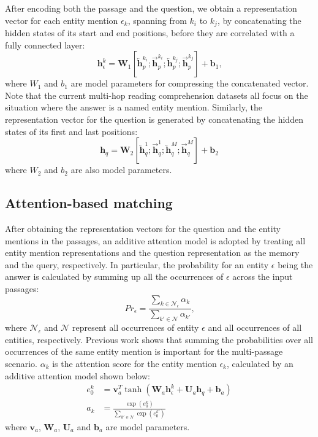 \documentclass[letterpaper]{article}
\begin{document}
After encoding both the passage and the question, we obtain a representation vector for each entity mention $\epsilon_k$, spanning from $k_i$ to $k_j$, by concatenating the hidden states of its start and end positions, before they are correlated with a fully connected layer:
\begin{equation} \label{eq:base_rep}
\boldsymbol{h}_\epsilon^k = \boldsymbol{W}_1 [\overleftarrow{\boldsymbol{h}}_p^{k_i};\overrightarrow{\boldsymbol{h}}_p^{k_i};\overleftarrow{\boldsymbol{h}}_p^{k_j};\overrightarrow{\boldsymbol{h}}_p^{k_j}]+\boldsymbol{b}_1 \textrm{,}
\end{equation}
where $W_1$ and $b_1$ are model parameters for compressing the concatenated vector.
Note that the current multi-hop reading comprehension datasets all focus on the situation where the answer is a named entity mention.
Similarly, the representation vector for the question is generated by concatenating the hidden states of its first and last positions:
\begin{equation}
\boldsymbol{h}_q = \boldsymbol{W}_2 [\overleftarrow{\boldsymbol{h}}_q^1;\overrightarrow{\boldsymbol{h}}_q^1;\overleftarrow{\boldsymbol{h}}_q^M;\overrightarrow{\boldsymbol{h}}_q^M]+\boldsymbol{b}_2
\end{equation}
where $W_2$ and $b_2$ are also model parameters.


\subsection{Attention-based matching}

After obtaining the representation vectors for the question and the entity mentions in the passages, an additive attention model \citep{bahdanau2015neural}
is adopted by treating all entity mention representations and the question representation as the memory and the query, respectively.
In particular, the probability for an entity $\epsilon$ being the answer is calculated by summing up all the occurrences of $\epsilon$ across the input passages:
\begin{equation} \label{eq:merge}
Pr_\epsilon = \frac{\sum_{k\in \mathcal{N}_\epsilon} \alpha_k}{\sum_{k'\in \mathcal{N}} \alpha_{k'}} \textrm{,}
\end{equation}
where $\mathcal{N}_\epsilon$ and $\mathcal{N}$ represent all occurrences of entity $\epsilon$ and all occurrences of all entities, respectively. 
Previous work \citep{wang2018r3} shows that summing the probabilities over all occurrences of the same entity mention is important for the multi-passage scenario.
$\alpha_k$ is the attention score for the entity mention $\epsilon_k$, calculated by an additive attention model shown below:
\begin{align}
e_0^k &= \boldsymbol{v}_a^T \tanh(\boldsymbol{W}_a \boldsymbol{h}_\epsilon^k + \boldsymbol{U}_a \boldsymbol{h}_q + \boldsymbol{b}_a) \\
a_k &= \frac{\exp(e_0^k)}{\sum_{k'\in \mathcal{N}} \exp(e_0^{k'})} \label{eq:softmax}
\end{align}
where $\boldsymbol{v}_a$, $\boldsymbol{W}_a$, $\boldsymbol{U}_a$ and $\boldsymbol{b}_a$ are model parameters.
\end{document}
